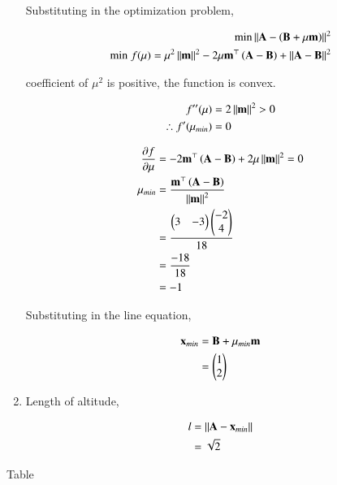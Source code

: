 \documentclass[journal,12pt,twocolumn]{IEEEtran}
\begin{document}
\begin{enumerate}
	Substituting in the optimization problem,

	\begin{align}
		\text{min} \left\lVert\mathbf{A} - \left(\mathbf{B} + \mu \mathbf{m}\right) \right\rVert^2\\
		\text{min} \; f(\mu) = \mu^2 \left\lVert\mathbf{m}\right\rVert^2 - 2 \mu \mathbf{m}^{\top} \left(\mathbf{A} - \mathbf{B}\right) + \left\lVert\mathbf{A} - \mathbf{B}\right\rVert^2
	\end{align}
		
	 coefficient of $\mu^2$ is positive, the function is convex.

	\begin{align}
		f''(\mu) &= 2 \left\lVert\mathbf{m}\right\rVert^2 > 0\\
		\therefore f'(\mu_{min}) &= 0
	\end{align}

	\begin{align}
                \frac{\partial f}{\partial \mu} &= - 2 \mathbf{m}^{\top} \left(\mathbf{A} - \mathbf{B}\right) + 2 \mu \left\lVert\mathbf{m}\right\rVert^2 = 0 \\
		\mu_{min} &= \frac{\mathbf{m}^{\top} \left(\mathbf{A} - \mathbf{B}\right)}{\left\lVert\mathbf{m}\right\rVert^2} \\
                &= \frac{\begin{pmatrix}3 & -3\end{pmatrix} \begin{pmatrix}-2 \\ 4\end{pmatrix}}{18} \\
                &= \frac{-18}{18} \\
                &= -1
        \end{align}
	
	Substituting in the line equation,

	\begin{align}
		\mathbf{x}_{min} &= \mathbf{B} + \mu_{min} \mathbf{m} \\ 
		&= \begin{pmatrix}1\\2\end{pmatrix}
	\end{align}


\item 	Length of altitude,

	\begin{align}
		l &= \left\lVert\mathbf{A} - \mathbf{x}_{min}\right\rVert \\
		&= \sqrt{2}
	\end{align}

\end{enumerate}

\begin{table}[h!] 
\centering
        
        \caption{Table}
        \label{tab:}
\end{table} 
\end{document}
